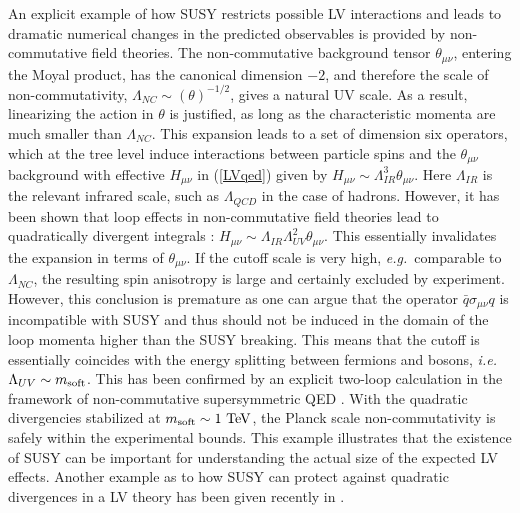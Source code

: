 \documentclass[12pt]{revtex4}
\begin{document}
An explicit example of how SUSY restricts possible LV interactions and
leads to dramatic numerical changes in the predicted observables is
provided by non-commutative field theories. The non-commutative
background tensor $\theta_{\mu\nu}$, entering the Moyal product, has
the canonical dimension $-2$, and therefore the scale of non-commutativity,
$\Lambda_{NC} \sim(\theta)^{-1/2}$, gives a natural UV scale. 
As a result, linearizing the action in $\theta$ is justified, as long as the
characteristic momenta are much smaller than $\Lambda_{NC}$. 
This expansion leads to a set of dimension six operators, which at the
tree level induce interactions between particle spins and the 
$\theta_{\mu\nu}$ background \cite{MPR1} with effective 
$H_{\mu\nu}$ in (\ref{LVqed}) given by 
$H_{\mu\nu} \sim\Lambda_{IR}^3\theta_{\mu\nu}$. 
Here $ \Lambda_{IR}$ is the relevant infrared scale, such as 
$\Lambda_{QCD}$ in the case of hadrons. However, it has been shown
that loop effects in non-commutative field theories lead to
quadratically divergent integrals \cite{UCSC}: 
$H_{\mu\nu} \sim \Lambda_{IR}\Lambda_{UV}^2\theta_{\mu\nu}$. 
This essentially invalidates the expansion in terms of $\theta_{\mu\nu}$. 
If the cutoff scale is very high, {\em e.g.}\ comparable to $\Lambda_{NC}$, 
the resulting spin anisotropy is large and certainly excluded by
experiment. However, this conclusion is premature as  
one can argue that the operator $\bar q \sigma_{\mu\nu} q$ 
is incompatible with SUSY \cite{MPR2} and thus should not be induced 
in the domain of the loop momenta higher than the SUSY breaking. 
This means that the cutoff is essentially coincides with the 
energy splitting between fermions and bosons, {\em i.e.}\ 
$\Lambda_{UV} \sim m_{\rm soft}$. This has been confirmed by an
explicit two-loop calculation in the framework of  non-commutative
supersymmetric QED \cite{WMC2}. With the quadratic divergencies 
stabilized at $m_{\rm soft}\sim 1~{\rm TeV}$,
the Planck scale non-commutativity is safely within the experimental 
bounds. This example illustrates that the existence of SUSY can be
important for understanding the actual size of the expected LV effects. 
Another example as to how SUSY can protect against quadratic
divergences in a LV theory has been given recently in \cite{Jain:2005as}. 
\end{document}
